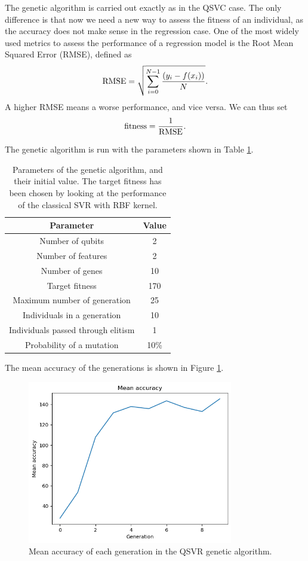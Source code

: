 \documentclass[12pt]{article}
\begin{document}
The genetic algorithm is carried out exactly as in the QSVC case. The only difference is that now we need a new way to assess the fitness of an individual, as the accuracy does not make sense in the regression case. One of the most widely used metrics to assess the performance of a regression model is the Root Mean Squared Error (RMSE), defined as 
\begin{equation}
    \textup{RMSE}=\sqrt{\sum_{i=0}^{N-1}\frac{(y_i-f(x_i))}{N}}.
\end{equation}
A higher RMSE means a worse performance, and vice versa. We can thus set
\begin{equation}
    \textup{fitness}=\frac{1}{\textup{RMSE}}.
\end{equation} 

The genetic algorithm is run with the parameters shown in Table \ref{tabella accettanza svr}.
\begin{table}[h]
    \centering
    \begin{tabular}{||c c||} 
     \hline
     Parameter & Value  \\ [0.5ex] 
     \hline\hline
     Number of qubits & 2 \\ 
     Number of features & 2  \\
     Number of genes & 10  \\
     Target fitness & 170  \\ 
     Maximum number of generation & 25  \\
     Individuals in a generation & 10  \\ 
     Individuals passed through elitism & 1 \\
     Probability of a mutation & 10\% \\  
     \hline
    \end{tabular}
    \caption{Parameters of the genetic algorithm, and their initial value. The target fitness has been chosen by looking at the performance of the classical SVR with RBF kernel.}
    \label{tabella accettanza svr}
\end{table}
The mean accuracy of the generations is shown in Figure \ref{fig:mean accuracy svr}.
\begin{figure}[h!]
    \centering
    \includegraphics[width=0.8\textwidth]{images/meanfitnesssvr.png}
    \caption{Mean accuracy of each generation in the QSVR genetic algorithm.}
    \label{fig:mean accuracy svr}
\end{figure}
\end{document}
